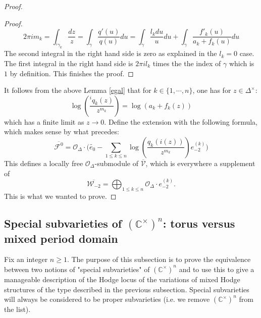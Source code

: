 \documentclass[10pt]{article}
\numberwithin{equation}{subsection}
\theoremstyle{plain}
\newtheorem{corollary}[theorem]{Corollary}
\theoremstyle{definition}
\theoremstyle{remark}
\newcommand{\C}{\mathbb C}
\begin{document}
\begin{proof}
\begin{proof}
\[
2 \pi i m_k = \int_{^i\gamma_k} \frac{dz}{z} = \int_\gamma \frac{q'(u)}{q(u)}du = \int_\gamma \frac{l_k du}{u} du + \int_\gamma \frac{f'_k(u)}{a_k + f_k(u)}du
\]
The second integral in the right hand side is zero as explained in the $l_k = 0$ case. The first integral in the right hand side is $2 \pi i l_k$ times the the index of $\gamma$ which is $1$ by definition. This finishes the proof.
\end{proof}
It follows from the above Lemma \ref{egal} that for $k \in \{1,\cdots, n\}$, one has for $z \in \Delta^\times$:
\[
\log(\frac{^iq_k(z)}{z^{m_k}}) = \log(a_k + f_k(z))
\]
which has a finite limit as $z \rightarrow 0$. Define the extension with the following formula, which makes sense by what precedes:
\[
\overline{\mathcal{F}^0} = \mathcal{O}_\Delta \cdot \Big( \tilde{e_0} - \sum_{1 \leqslant k \leqslant n} \log(\frac{q_k(i(z))}{z^{m_k}})e_{-2}^{(k)} \Big)
\]
This defines a locally free $\mathcal{O}_\Delta$-submodule of $\overline{\mathcal{V}}$, which is everywhere a supplement of 
\[
\overline{\mathcal{W}_{-2}} = \bigoplus_{1 \leqslant k \leqslant n} \mathcal{O}_{\Delta} \cdot e_{-2}^{(k)}.
\]
This is what we wanted to prove.
\end{proof}
\subsection{Special subvarieties of $(\C^\times)^n$: torus versus mixed period domain}
Fix an integer $n \geqslant 1$. The purpose of this subsection is to prove the equivalence between two notions of "special subvarieties" of $(\C^\times)^n$ and to use this to give a manageable description of the Hodge locus of the variations of mixed Hodge structures of the type described in the previous subsection. Special subvarieties will always be considered to be proper subvarieties (i.e. we remove $(\C^\times)^n$ from the list). 
\end{document}
